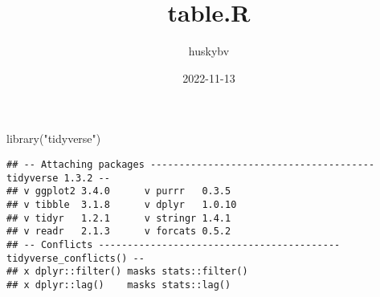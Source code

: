 \documentclass[
]{article}
\title{table.R}
\author{huskybv}
\date{2022-11-13}
\newenvironment{Shaded}{\begin{snugshade}}{\end{snugshade}}
\newcommand{\FunctionTok}[1]{\textcolor[rgb]{0.00,0.00,0.00}{#1}}
\newcommand{\NormalTok}[1]{#1}
\newcommand{\StringTok}[1]{\textcolor[rgb]{0.31,0.60,0.02}{#1}}
\begin{document}
\maketitle

\begin{Shaded}
\begin{Highlighting}[]
\FunctionTok{library}\NormalTok{(}\StringTok{"tidyverse"}\NormalTok{)}
\end{Highlighting}
\end{Shaded}

\begin{verbatim}
## -- Attaching packages --------------------------------------- tidyverse 1.3.2 --
## v ggplot2 3.4.0      v purrr   0.3.5 
## v tibble  3.1.8      v dplyr   1.0.10
## v tidyr   1.2.1      v stringr 1.4.1 
## v readr   2.1.3      v forcats 0.5.2 
## -- Conflicts ------------------------------------------ tidyverse_conflicts() --
## x dplyr::filter() masks stats::filter()
## x dplyr::lag()    masks stats::lag()
\end{verbatim}
\end{document}
